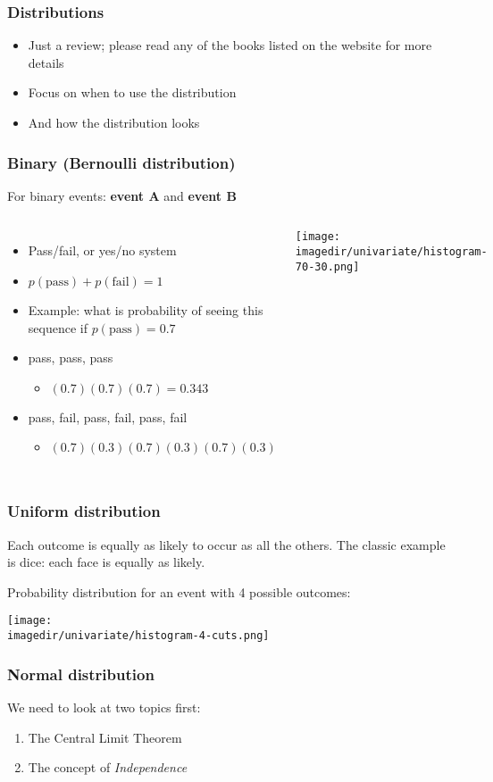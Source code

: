 \begin{frame}\frametitle{Distributions}
	\begin{itemize}
		\item Just a review; please read any of the books listed on the website for more details
		\item Focus on when to use the distribution
		\item And how the distribution looks
	\end{itemize}
\end{frame}

\begin{frame}\frametitle{Binary (Bernoulli distribution)}
	For binary events: \textbf{event A} and \textbf{event B}
	\begin{columns}
		\column{6cm}
		\begin{itemize}
			\item Pass/fail, or yes/no system
			\item $p(\text{pass}) + p(\text{fail}) = 1$
			\item Example: what is probability of seeing this sequence if $p(\text{pass}) = 0.7$
			\item pass, pass, pass
			\begin{itemize}
				\item $(0.7)(0.7)(0.7) = 0.343$
			\end{itemize}
			\item pass, fail, pass, fail, pass, fail
			\begin{itemize}
				\item $(0.7)(0.3)(0.7)(0.3)(0.7)(0.3)$
			\end{itemize}
		\end{itemize}
		\column{5cm}
		\texttt{[image: \\imagedir/univariate/histogram-70-30.png]}
	\end{columns}
\end{frame}

\begin{frame}\frametitle{Uniform distribution}
	Each outcome is equally as likely to occur as all the others. The classic example is dice: each face is equally as likely.

	Probability distribution for an event with 4 possible outcomes:

	\texttt{[image: \\imagedir/univariate/histogram-4-cuts.png]}
\end{frame}

\begin{frame}\frametitle{Normal distribution}

	We need to look at two topics first:
	\begin{enumerate}
		\item The Central Limit Theorem
		\item The concept of \emph{Independence}
	\end{enumerate}
\end{frame}

